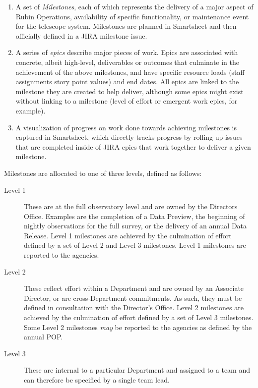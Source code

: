 \begin{enumerate}
    \item A set of \emph{Milestones}, each of which represents the delivery of a major aspect of Rubin Operations, availability of specific functionality, or maintenance event for the telescope system.
        Milestones are planned in Smartsheet and then officially defined in a \gls{JIRA} milestone issue.
    \item A series of \emph{epics} describe major pieces of work.
        Epics are associated with concrete, albeit high-level, deliverables or outcomes that culminate in the achievement of the above milestones, and have specific resource loads (staff assignments story point values) and end dates.
        All epics are linked to the milestone they are created to help deliver, although some epics might exist without linking to a milestone (level of effort or emergent work epics, for example).
    \item A visualization of progress on work done towards achieving milestones is captured in Smartsheet, which directly tracks progress by rolling up issues that are completed inside of \gls{JIRA} epics that work together to deliver a given milestone.
\end{enumerate}

Milestones are allocated to one of three levels, defined as follows:

\begin{description}
\item[Level 1] These are at the full observatory level and are owned by the Directors Office.
Examples are the completion of a Data Preview, the beginning of nightly observations for the full survey, or the delivery of an annual Data Release.
Level 1 milestones are achieved by the culmination of effort defined by a set of Level 2 and Level 3 milestones.
Level 1 milestones are reported to the agencies.
\item[Level 2] These reflect effort within a Department and are owned by an Associate Director, or are cross-Department commitments.
As such, they must be defined in consultation with the Director's Office.
Level 2 milestones are achieved by the culmination of effort defined by a set of Level 3 milestones.
Some Level 2 milestones {\it may} be reported to the agencies as defined by the annual POP.
\item[Level 3] These are internal to a particular Department and assigned to a team and can therefore be specified by a single team lead.
\end{description}

